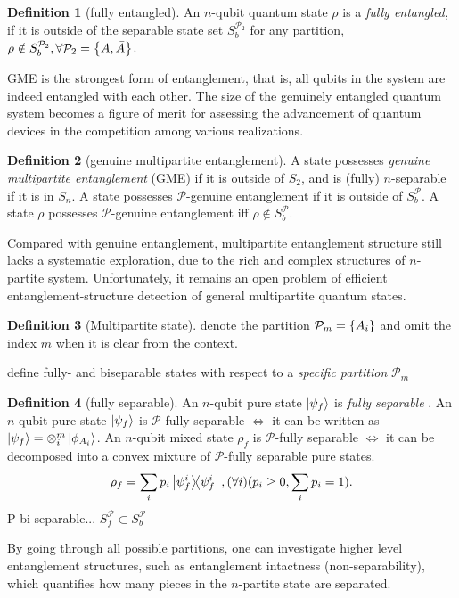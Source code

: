 \documentclass[
10pt,
aps,
pra,
linenumbers,
floatfix,
]{revtex4-2}
\theoremstyle{plain}
\theoremstyle{definition}
\newtheorem{definition}{Definition}
\newtheorem{remark}{Remark}
\newcommand{\separable}{S}
\newcommand{\ppartition}{\mathcal{P}}
\newcommand{\dm}{\rho}
\begin{document}
\begin{definition}[fully entangled]\label{def:fully_entangled}
	An $n$-qubit quantum state $\dm$ is a \emph{fully entangled},
	if it is outside of the separable state set $S_b^{\ppartition_2}$ for any partition,
	$\dm \notin S_b^{\ppartition_2},\forall \ppartition_2 = \qty{A,\bar{A}}$.
\end{definition}
GME is the strongest form of entanglement, that is, 
all qubits in the system are indeed entangled with each other.
The size of the genuinely entangled quantum system becomes a figure of merit for assessing the advancement of quantum devices in the competition among various realizations.
\begin{definition}[genuine multipartite entanglement]\label{def:gme}
	A state possesses \emph{genuine multipartite entanglement} (GME) if it is outside of $S_2$, and is (fully) $n$-separable if it is in $S_n$.
	A state possesses $\ppartition$-genuine entanglement if it is outside of $S_b^\ppartition$.
	A state $\dm$ possesses $\ppartition$-genuine entanglement iff $\dm\notin S_b^\ppartition$.
\end{definition}
	Compared with genuine entanglement, multipartite entanglement structure still lacks a systematic exploration, due to the rich and complex structures of $n$-partite system.
	Unfortunately, it remains an open problem of efficient entanglement-structure detection of general multipartite quantum states.
\begin{definition}[Multipartite state]
	denote the partition $\ppartition_m = \qty{A_i}$
	and omit the index $m$ when it is clear from the context.
\end{definition}
define fully- and biseparable states with respect to a \emph{specific partition} $\ppartition_m$
\begin{definition}[fully separable]\label{def:fully_separable}
	An $n$-qubit pure state $\ket{\psi_f}$ is \emph{fully separable} \iff .
	An $n$-qubit pure state $\ket{\psi_f}$ is $\ppartition$-fully separable $\iff$ it can be written as 
	$\ket{\psi_f}=\otimes_i^m \ket{\phi_{A_i}}$.
	An $n$-qubit mixed state $\dm_f$ is $\ppartition$-fully separable $\iff$ it can be decomposed into a convex mixture of $\ppartition$-fully separable pure states.
	\begin{equation}
		\dm_f = \sum_i p_i \op{\psi_f^i}, (\forall i) ( p_i\ge 0, \sum_i p_i = 1) .
	\end{equation}
	P-bi-separable... $\separable_f^\ppartition \subset S_b^\ppartition$
\end{definition}
By going through all possible partitions, one can investigate higher level entanglement structures, such as entanglement intactness (non-separability), which quantifies how many pieces in the $n$-partite state are separated.
\end{document}
